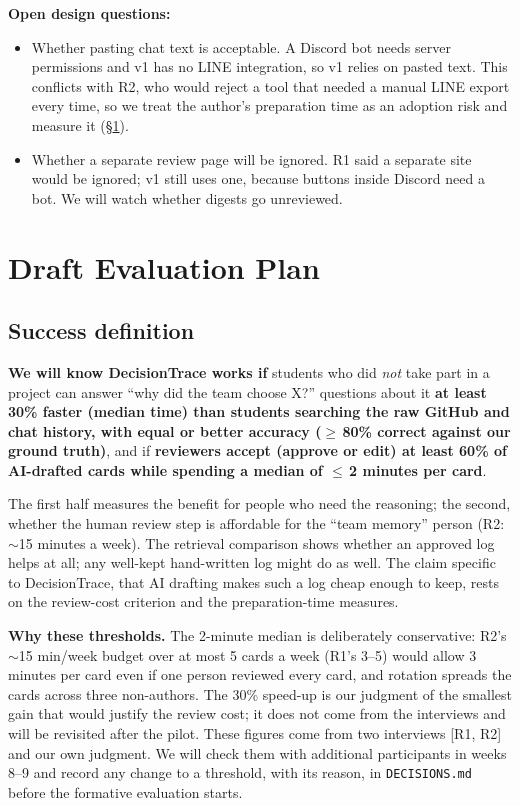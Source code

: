 \documentclass[11pt,a4paper]{article}
\newcommand{\code}[1]{\texttt{#1}}
\begin{document}
\textbf{Open design questions:}
\begin{itemize}
  \item Whether pasting chat text is acceptable. A Discord bot needs server permissions and v1 has no LINE integration, so v1 relies on pasted text. This conflicts with R2, who would reject a tool that needed a manual LINE export every time, so we treat the author's preparation time as an adoption risk and measure it (\S\ref{sec:eval}).
  \item Whether a separate review page will be ignored. R1 said a separate site would be ignored; v1 still uses one, because buttons inside Discord need a bot. We will watch whether digests go unreviewed.
\end{itemize}

\section{Draft Evaluation Plan}\label{sec:eval}

\subsection{Success definition}\label{sec:success}

\begin{keybox}
\textbf{We will know DecisionTrace works if} students who did \emph{not} take part in a project can answer ``why did the team choose X?'' questions about it \textbf{at least 30\% faster (median time) than students searching the raw GitHub and chat history, with equal or better accuracy ($\geq$\,80\% correct against our ground truth)}, and if \textbf{reviewers accept (approve or edit) at least 60\% of AI-drafted cards while spending a median of $\leq$\,2 minutes per card}.
\end{keybox}

The first half measures the benefit for people who need the reasoning; the second, whether the human review step is affordable for the ``team memory'' person (R2: $\sim$15 minutes a week). The retrieval comparison shows whether an approved log helps at all; any well-kept hand-written log might do as well. The claim specific to DecisionTrace, that AI drafting makes such a log cheap enough to keep, rests on the review-cost criterion and the preparation-time measures.

\textbf{Why these thresholds.} The 2-minute median is deliberately conservative: R2's $\sim$15 min/week budget over at most 5 cards a week (R1's 3--5) would allow 3 minutes per card even if one person reviewed every card, and rotation spreads the cards across three non-authors. The 30\% speed-up is our judgment of the smallest gain that would justify the review cost; it does not come from the interviews and will be revisited after the pilot. These figures come from two interviews [R1, R2] and our own judgment. We will check them with additional participants in weeks 8--9 and record any change to a threshold, with its reason, in \code{DECISIONS.md} before the formative evaluation starts.
\end{document}
